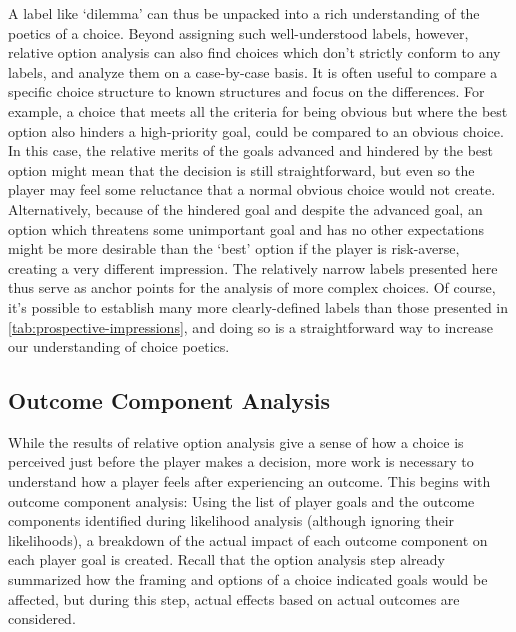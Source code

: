 A label like `dilemma' can thus be unpacked into a rich understanding of the poetics of a choice.
%
Beyond assigning such well-understood labels, however, relative option analysis can also find choices which don't strictly conform to any labels, and analyze them on a case-by-case basis.
%
It is often useful to compare a specific choice structure to known structures and focus on the differences.
%
For example, a choice that meets all the criteria for being obvious but where the best option also hinders a high-priority goal, could be compared to an obvious choice.
%
In this case, the relative merits of the goals advanced and hindered by the best option might mean that the decision is still straightforward, but even so the player may feel some reluctance that a normal obvious choice would not create.
%
Alternatively, because of the hindered goal and despite the advanced goal, an option which threatens some unimportant goal and has no other expectations might be more desirable than the `best' option if the player is risk-averse, creating a very different impression.
%
The relatively narrow labels presented here thus serve as anchor points for the analysis of more complex choices.
%
Of course, it's possible to establish many more clearly-defined labels than those presented in \cref{tab:prospective-impressions}, and doing so is a straightforward way to increase our understanding of choice poetics.


\subsection{Outcome Component Analysis}

\label{sec:cp-outcome-component-analysis}

While the results of relative option analysis give a sense of how a choice is perceived just before the player makes a decision, more work is necessary to understand how a player feels after experiencing an outcome.
%
This begins with outcome component analysis: Using the list of player goals and the outcome components identified during likelihood analysis (although ignoring their likelihoods), a breakdown of the actual impact of each outcome component on each player goal is created.
%
Recall that the option analysis step already summarized how the framing and options of a choice indicated goals would be affected, but during this step, actual effects based on actual outcomes are considered.


